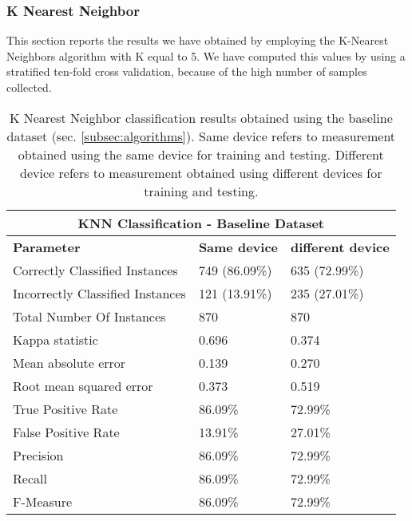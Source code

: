 \subsubsection{K Nearest Neighbor}
This section reports the results we have obtained by employing the K-Nearest Neighbors algorithm with K equal to 5.
We have computed this values by using a stratified ten-fold cross validation, because of the high number of samples collected.

\begin{table}
\center
\caption[K Nearest Neighbor classification results obtained using the baseline dataset.]{K Nearest Neighbor classification results obtained using the baseline dataset (sec. \ref{subsec:algorithms}). Same device refers to measurement obtained using the same device for training and testing. Different device refers to measurement obtained using different devices for training and testing.}
\label{tab:knn-baseline}
\begin{tabular}{ |l|l|l| }
  \hline
  \multicolumn{3}{|c|}{\textbf{KNN Classification - Baseline Dataset}} \\
  \hline
  \textbf{Parameter} & \textbf{Same device} & \textbf{different device}\\
  \hline
  Correctly Classified Instances & 749 (86.09\%) & 635 (72.99\%) \\
  Incorrectly Classified Instances & 121 (13.91\%) & 235 (27.01\%) \\
  Total Number Of Instances & 870 & 870 \\
  Kappa statistic & 0.696 & 0.374 \\
  Mean absolute error & 0.139 & 0.270 \\
  Root mean squared error & 0.373 & 0.519 \\
  True Positive Rate & 86.09\% & 72.99\% \\
  False Positive Rate & 13.91\% & 27.01\% \\
  Precision & 86.09\% & 72.99\% \\
  Recall & 86.09\% & 72.99\% \\
  F-Measure & 86.09\% & 72.99\% \\
  \hline
\end{tabular}
\end{table}

